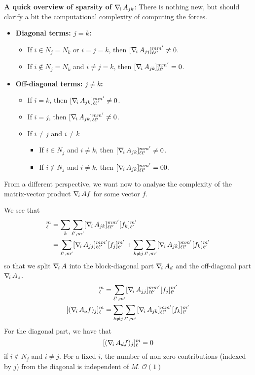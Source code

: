 \bigskip

\noindent
{\bf A quick overview of sparsity of $\nabla_{\!i}\, A_{jk}$}: There is nothing new, but should clarify a bit the computational complexity of computing the forces.
\begin{itemize}
\item {\bf Diagonal terms: $j=k$:}
	\begin{itemize}
		\item If $i\in N_j=N_k$ or $i=j=k$, then $[ \nabla_{\!i}\, A_{jj}]_{\ell \ell'}^{m m'} \neq 0$. 
		\item If $i\not \in N_j=N_k$ and  $i\neq j=k$, then $[ \nabla_{\!i}\, A_{jk}]_{\ell \ell'}^{m m'} = 0$.
	\end{itemize}
\item {\bf Off-diagonal terms: $j\neq k$:}
	\begin{itemize}
		\item If $i=k$, then $[ \nabla_{\!i}\, A_{jk}]_{\ell \ell'}^{m m'} \neq 0$.
		\item If $i=j$, then $[ \nabla_{\!i}\, A_{jk}]_{\ell \ell'}^{m m'} \neq 0$.
		\item If $i\neq j$ and $i\neq k$
		\begin{itemize}
			\item If $i\in N_j$ and $i\neq k$, then $[ \nabla_{\!i}\, A_{jk}]_{\ell \ell'}^{m m'} \neq 0$.
			\item If $i\not\in N_j$ and $i\neq k$, then $[ \nabla_{\!i}\, A_{jk}]_{\ell \ell'}^{m m'} =0 0$.
		\end{itemize}
	\end{itemize}
\end{itemize}
From a different perspective, we want now to analyse the complexity of the matrix-vector product $\nabla_{\!i}\, A f$ for some vector $f$.
%

We see that 
\begin{align*}
	[(\nablai A f)_j]_\ell^m 
	&= \sum_k \sum_{\ell',m'} [\nablai A_{jk}]_{\ell \ell'}^{m m'} [f_k]_{\ell'}^{m'} \\
	&= \sum_{\ell',m'} [\nablai A_{jj}]_{\ell \ell'}^{m m'} [f_j]_{\ell'}^{m'} 
	+ \sum_{k\neq j} \sum_{\ell',m'} [\nablai A_{jk}]_{\ell \ell'}^{m m'} [f_k]_{\ell'}^{m'} 
\end{align*}
so that we split $\nabla_{\!i}\, A$ into the block-diagonal part $\nabla_{\!i}\, A_d$ and the off-diagonal part $\nabla_{\!i}\, A_o$.
\begin{align*}
	[(\nablai A_d f)_j]_\ell^m 
	&= \sum_{\ell',m'} [\nablai A_{jj}]_{\ell \ell'}^{m m'} [f_j]_{\ell'}^{m'} \\
	[(\nablai A_o f)_j]_\ell^m 
	&= \sum_{k\neq j} \sum_{\ell',m'} [\nablai A_{jk}]_{\ell \ell'}^{m m'} [f_k]_{\ell'}^{m'} 
\end{align*}
For the diagonal part, we have that
\[
	[(\nabla_{\!i}\, A_d f)_j]_\ell^m = 0
\]
if $i\not\in N_j$ and $i\neq j$. For a fixed $i$, the number of non-zero contributions (indexed by $j$) from the diagonal is independent of $M$. $\mathcal O(1)$

